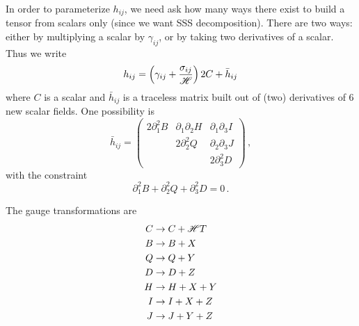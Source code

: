 \documentclass{article}
\begin{document}
In order to parameterize $h_{ij}$, we need ask how many ways there
exist to build a tensor from scalars only (since we want SSS decomposition).
There are two ways: either by multiplying a scalar by $\gamma_{ij}$,
or by taking two derivatives of a scalar. Thus we write
\[
h_{ij}=\left(\gamma_{ij}+\frac{\sigma_{ij}}{{\cal H}}\right)2C+\bar{h}_{ij}
\]
where $C$ is a scalar and $\bar{h}_{ij}$ is a traceless matrix built
out of (two) derivatives of 6 new scalar fields. One possibility is
\[
\bar{h}_{ij}=\left(\begin{array}{ccc}
2\partial_{1}^{2}B & \partial_{1}\partial_{2}H & \partial_{1}\partial_{3}I\\
 & 2\partial_{2}^{2}Q & \partial_{2}\partial_{3}J\\
 &  & 2\partial_{3}^{2}D
\end{array}\right)\,,
\]
with the constraint
\[
\partial_{1}^{2}B+\partial_{2}^{2}Q+\partial_{3}^{2}D=0\,.
\]


The gauge transformations are
\begin{align*}
C & \rightarrow C+{\cal H}T\\
B & \rightarrow B+X\\
Q & \rightarrow Q+Y\\
D & \rightarrow D+Z\\
H & \rightarrow H+X+Y\\
I & \rightarrow I+X+Z\\
J & \rightarrow J+Y+Z
\end{align*}
\end{document}
